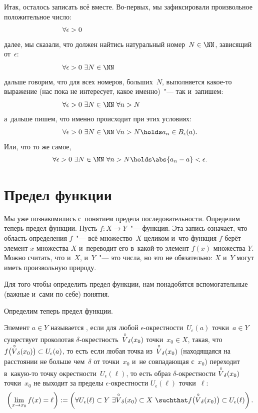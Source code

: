 Итак, осталось записать всё вместе. Во-первых, мы зафиксировали произвольное положительное число:
\[
	\forall \epsilon > 0
	\hphantom{%
		\ 
		\exists N \in \NN\ 
		\forall n > N
		\holds
		a_n \in B_\epsilon(a)
		.%
	}
\]
далее, мы сказали, что должен найтись натуральный номер~$N \in \NN$, зависящий от~$\epsilon$:
\[
	\forall \epsilon > 0\ 
	\exists N \in \NN
	\hphantom{%
		\ 
		\forall n > N
		\holds
		a_n \in B_\epsilon(a)
		.%
	}
\]
дальше говорим, что для всех номеров, больших~$N$, выполняется какое-то выражение (нас пока не интересует, какое именно)~"--- так и~запишем:
\[
	\forall \epsilon > 0\ 
	\exists N \in \NN\ 
	\forall n > N
	\hphantom{%
		\holds
		a_n \in B_\epsilon(a)
		.%
	}
\]
а~дальше пишем, что именно происходит при этих условиях:
\[
	\forall \epsilon > 0\ 
	\exists N \in \NN\ 
	\forall n > N
	\holds
	a_n \in B_\epsilon(a)
	.
\]
Или, что то же самое,
\[
	\forall \epsilon > 0\ 
	\exists N \in \NN\ 
	\forall n > N
	\holds
	\abs{a_n - a} < \epsilon
	.
\]


\section{Предел функции}

Мы уже познакомились с~понятием предела последовательности. Определим теперь предел функции. Пусть $f \colon X \to Y$~"--- функция. Эта запись означает, что область определения $f$~"--- всё множество~$X$ целиком и~что функция $f$ берёт элемент $x$ множества $X$ и~переводит его в~какой-то элемент $f(x)$ множества $Y$. Можно считать, что и~$X$, и~$Y$~"--- это числа, но это не обязательно: $X$ и~$Y$ могут иметь произвольную природу.

Для того чтобы определить предел функции, нам понадобятся вспомогательные (важные и~сами по себе) понятия.


Определим теперь предел функции.

\begin{definition}
	Элемент $a \in Y$ называется , если для любой $\epsilon$-окрестности~$U_\epsilon(a)$
	точки~$a \in Y$ существует проколотая
	$\delta$-окрестность~${\overset{\circ}{V}}_\delta(x_0)$ точки~$x_0 \in X$, такая, что $f
	\bigl( {\overset{\circ}{V}}_\delta(x_0) \bigr) \subset U_\epsilon(a)$, то есть если любая
	точка из~${\overset{\circ}{V}}_\delta(x_0)$ (находящаяся на расстоянии не больше чем~$\delta$
	от точки~$x_0$ и~не совпадающая с~$x_0$) переходит в~какую-то точку
	окрестности~$U_\epsilon(\ell)$, то есть образ $\delta$-окрестности
	${\overset{\circ}{V}}_\delta(x_0)$ точки~$x_0$ не выходит за пределы $\epsilon$-окрестности
	$U_\epsilon(\ell)$ точки~$\ell$:
	\[
		\left( 
			\lim_{x \to x_0} f(x) = \ell
		\right)
		:=
		\left( 
			\forall U_\epsilon(\ell) \subset Y\ 
			\exists \Vo_\delta(x_0) \subset X\ 
			\suchthat
			f \bigl( \Vo_\delta(x_0) \bigr) \subset
			U_\epsilon(\ell)
		\right)
		.
	\]
\end{definition}

